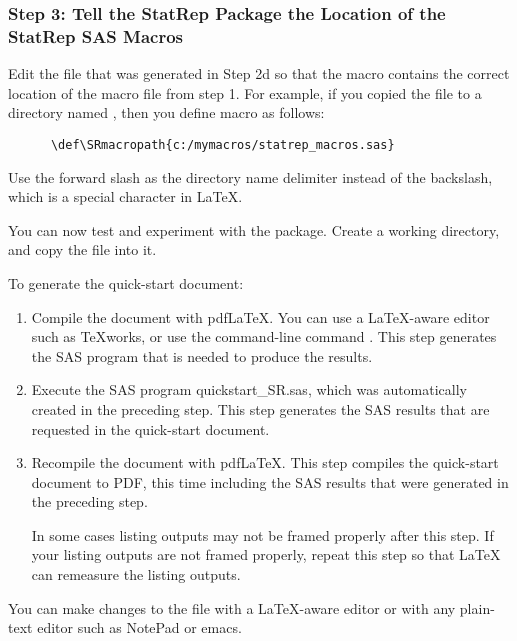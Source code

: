 \documentclass[article,oneside]{memoir}
\begin{document}
\subsubsection{Step 3: Tell the StatRep Package the Location of the StatRep SAS Macros}

   Edit the  file that was generated in Step 2d so that the macro 
    contains
   the correct location of the macro file from step 1. For example, if
   you copied the  file to a directory named 
   ,
   then you define macro  as follows:
   \begin{verbatim}
      \def\SRmacropath{c:/mymacros/statrep_macros.sas}
   \end{verbatim}

   Use the forward slash
   as the directory name delimiter instead of the backslash, which is a special
   character in LaTeX.

   You can now test and experiment with the package. Create a working
   directory, and copy the file  into it.

   To generate the quick-start document:
\begin{enumerate}
\item Compile the document with pdf\LaTeX. You can use a \LaTeX-aware
      editor such as \TeX works, or use the command-line command .
      This step generates the SAS program that is needed to produce the results.

\item Execute the SAS program quickstart\_SR.sas, which was automatically
      created in the preceding step. This step generates the SAS
      results that are requested in the quick-start document.
      

\item Recompile the document with pdf\LaTeX. This step compiles the
      quick-start document to PDF, this time including the SAS results
      that were generated in the preceding step.

      In some cases listing outputs may not be framed properly after this step.
      If your listing outputs are not framed properly, repeat this step so that 
      LaTeX can remeasure the listing outputs.

\end{enumerate}
   You can make changes to the file with a \LaTeX-aware editor
   or with any plain-text editor such as \textsf{NotePad} or \textsf{emacs}.
\end{document}
